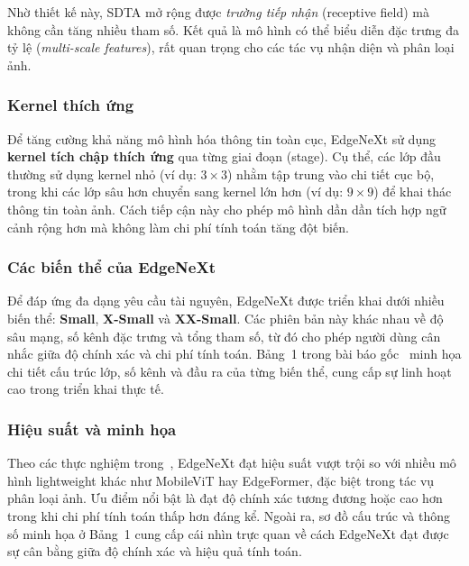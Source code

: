 Nhờ thiết kế này, SDTA mở rộng được \textit{trường tiếp nhận} (receptive field) mà không cần tăng nhiều tham số. Kết quả là mô hình có thể biểu diễn đặc trưng đa tỷ lệ (\textit{multi-scale features}), rất quan trọng cho các tác vụ nhận diện và phân loại ảnh.

\subsubsection{Kernel thích ứng}
Để tăng cường khả năng mô hình hóa thông tin toàn cục, EdgeNeXt sử dụng \textbf{kernel tích chập thích ứng} qua từng giai đoạn (stage). Cụ thể, các lớp đầu thường sử dụng kernel nhỏ (ví dụ: $3 \times 3$) nhằm tập trung vào chi tiết cục bộ, trong khi các lớp sâu hơn chuyển sang kernel lớn hơn (ví dụ: $9 \times 9$) để khai thác thông tin toàn ảnh. Cách tiếp cận này cho phép mô hình dần dần tích hợp ngữ cảnh rộng hơn mà không làm chi phí tính toán tăng đột biến.

\subsubsection{Các biến thể của EdgeNeXt}
Để đáp ứng đa dạng yêu cầu tài nguyên, EdgeNeXt được triển khai dưới nhiều biến thể: \textbf{Small}, \textbf{X-Small} và \textbf{XX-Small}. Các phiên bản này khác nhau về độ sâu mạng, số kênh đặc trưng và tổng tham số, từ đó cho phép người dùng cân nhắc giữa độ chính xác và chi phí tính toán. Bảng~1 trong bài báo gốc~\cite{george2024edgeface} minh họa chi tiết cấu trúc lớp, số kênh và đầu ra của từng biến thể, cung cấp sự linh hoạt cao trong triển khai thực tế.

\subsubsection{Hiệu suất và minh họa}
Theo các thực nghiệm trong~\cite{george2024edgeface}, EdgeNeXt đạt hiệu suất vượt trội so với nhiều mô hình lightweight khác như MobileViT hay EdgeFormer, đặc biệt trong tác vụ phân loại ảnh. Ưu điểm nổi bật là đạt độ chính xác tương đương hoặc cao hơn trong khi chi phí tính toán thấp hơn đáng kể. Ngoài ra, sơ đồ cấu trúc và thông số minh họa ở Bảng~1 cung cấp cái nhìn trực quan về cách EdgeNeXt đạt được sự cân bằng giữa độ chính xác và hiệu quả tính toán.\\



